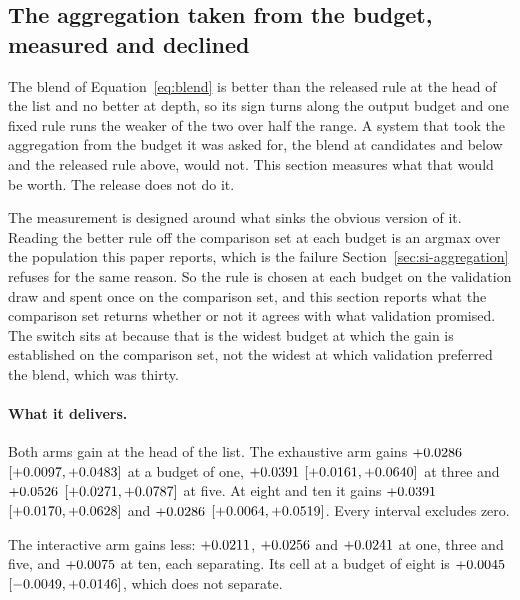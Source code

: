 \documentclass[journal=jcisd8,manuscript=suppinfo,layout=onecolumn]{achemso}
\begin{document}
\subsection{The aggregation taken from the budget, measured and declined}
\label{sec:si-blendschedule}

The blend of Equation~\ref{eq:blend} is better than the released rule at the head of the list and
no better at depth, so its sign turns along the output budget and one fixed rule runs the weaker
of the two over half the range. A system that took the aggregation from the budget it was asked
for, the blend at \numBlendSwitchWord{} candidates and below and the released rule above, would
not. This section measures what that would be worth. The release does not do it.

The measurement is designed around what sinks the obvious version of it. Reading the
better rule off the comparison set at each budget is an argmax over the population this paper
reports, which is the failure Section~\ref{sec:si-aggregation} refuses for the same reason.
So the rule is chosen at each budget on the validation draw and spent once on the comparison set,
and this section reports what the comparison set returns whether or not it agrees with what
validation promised. The switch sits at \numBlendSwitchWord{} because that is the widest budget at
which the
gain is established on the comparison set, not the widest at which validation preferred the blend,
which was thirty.

\paragraph{What it delivers.} Both arms gain at the head of the list. The exhaustive arm gains
$+0.0286$ $[+0.0097, +0.0483]$ at a budget of one,
$+0.0391$ $[+0.0161, +0.0640]$ at three and
$+0.0526$ $[+0.0271, +0.0787]$ at five. At eight
and ten it gains $+0.0391$
$[+0.0170, +0.0628]$ and $+0.0286$
$[+0.0064, +0.0519]$. Every interval excludes zero.

The interactive arm gains less: $+0.0211$, $+0.0256$ and
$+0.0241$ at one, three and five, and $+0.0075$ at ten, each
separating. Its cell at a budget of eight is $+0.0045$
$[-0.0049, +0.0146]$, which does not separate.
\end{document}
